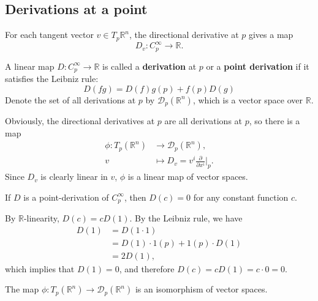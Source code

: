 \documentclass[en, oneside]{vivi}
\begin{document}
\subsection{Derivations at a point}
For each tangent vector $v \in T_p\mathbb{R}^n$, the directional derivative at $p$ gives a map
\begin{equation*}
    D_v: C_p^\infty \to \mathbb{R}.
\end{equation*}
\begin{dfn}
    A linear map $D: C_p^\infty \to \mathbb{R}$ is called a \textbf{derivation} at $p$ or a \textbf{point derivation} if it satisfies the Leibniz rule:
    \begin{equation*}
        D(fg) = D(f)g(p) + f(p)D(g)
    \end{equation*}
    Denote the set of all derivations at $p$ by $\mathcal{D}_p(\mathbb{R}^n)$, which is a vector space over $\mathbb{R}$.
\end{dfn}
Obviously, the directional derivatives at $p$ are all derivations at $p$, so there is a map
\begin{align*}
    \phi: T_p(\mathbb{R}^n) &\to \mathcal{D}_p(\mathbb{R}^n),\\
    v &\mapsto D_v = v^i \frac{\partial}{\partial x^i} \bigg|_{p}.
\end{align*}
Since $D_v$ is clearly linear in $v$, $\phi$ is a linear map of vector spaces.
\begin{lem}
    If $D$ is a point-derivation of $C_p^\infty$, then $D(c) = 0$ for any constant function $c$.
\end{lem}
\begin{pf}
    By $\mathbb{R}$-linearity, $D(c) = c D(1)$. By the Leibniz rule, we have
    \begin{align*}
        D(1) &= D(1 \cdot 1)\\
        &= D(1) \cdot 1(p) + 1(p) \cdot D(1)\\
        &= 2 D(1),
    \end{align*}
    which implies that $D(1) = 0$, and therefore $D(c) = c D(1) = c \cdot 0 = 0$.\\
\end{pf}
\begin{lem}
    The map $\phi: T_p(\mathbb{R}^n) \to \mathcal{D}_p(\mathbb{R}^n)$ is an isomorphism of vector spaces.
\end{lem}
\end{document}
